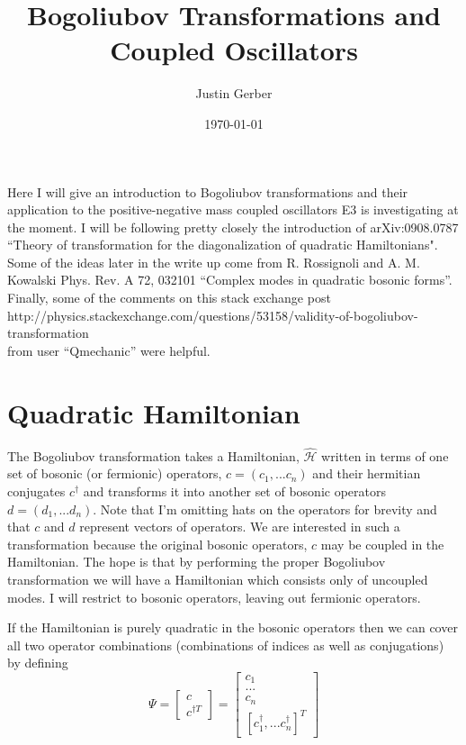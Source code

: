 \documentclass[12pt]{article}
\begin{document}

\title{Bogoliubov Transformations and Coupled Oscillators}%
\author{Justin Gerber}
\date{\today}

\maketitle

Here I will give an introduction to Bogoliubov transformations and their application to the positive-negative mass coupled oscillators E3 is investigating at the moment. I will be following pretty closely the introduction of arXiv:0908.0787 ``Theory of transformation for the diagonalization of quadratic Hamiltonians". Some of the ideas later in the write up come from R. Rossignoli and A. M. Kowalski
Phys. Rev. A 72, 032101 ``Complex modes in quadratic bosonic forms''. Finally, some of the comments on this stack exchange post http://physics.stackexchange.com/questions/53158/validity-of-bogoliubov-transformation 
\\from user ``Qmechanic'' were helpful.

\section{Quadratic Hamiltonian}
The Bogoliubov transformation takes a Hamiltonian, $\hat{\mathcal{H}}$ written in terms of one set of bosonic (or fermionic) operators, $c = (c_1, ... c_n)$ and their hermitian conjugates $c^{\dag}$ and transforms it into another set of bosonic operators $d = (d_1, ... d_n)$. Note that I'm omitting hats on the operators for brevity and that $c$ and $d$ represent vectors of operators. We are interested in such a transformation because the original bosonic operators, $c$ may be coupled in the Hamiltonian. The hope is that by performing the proper Bogoliubov transformation we will have a Hamiltonian which consists only of uncoupled modes. I will restrict to bosonic operators, leaving out fermionic operators.

If the Hamiltonian is purely quadratic in the bosonic operators then we can cover all two operator combinations (combinations of indices as well as conjugations) by defining
\begin{equation}\Psi = 
\begin{bmatrix}
c \\
c^{\dag T}
\end{bmatrix} = 
\begin{bmatrix}
c_1\\
...\\
c_n\\
[c_1^{\dagger}, ... c_n^{\dagger}]^T
\end{bmatrix}
\end{equation}
\end{document}
